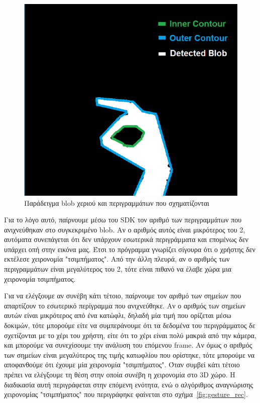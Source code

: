 \begin{figure}[H]
    \centering
    \includegraphics[scale=0.7, angle=0]{Files/Figures/2.pdf}
    \caption[Παράδειγμα blob χεριού και περιγραμμάτων που σχηματίζονται]{Παράδειγμα blob χεριού και περιγραμμάτων που σχηματίζονται}
    \label{fig:hand_blob}
\end{figure}



Για το λόγο αυτό, παίρνουμε μέσω του SDK τον αριθμό των περιγραμμάτων που ανιχνεύθηκαν στο συγκεκριμένο blob. Αν ο αριθμός αυτός είναι μικρότερος του 2, αυτόματα συνεπάγεται ότι δεν υπάρχουν εσωτερικά περιγράμματα και επομένως δεν υπάρχει οπή στην εικόνα μας. Έτσι το πρόγραμμα γνωρίζει σίγουρα ότι ο χρήστης δεν εκτέλεσε χειρονομία "τσιμπήματος". Από την άλλη πλευρά, αν ο αριθμός των περιγραμμάτων είναι μεγαλύτερος του 2, τότε είναι πιθανό να έλαβε χώρα μια χειρονομία τσιμπήματος. 


Για να ελέγξουμε αν συνέβη κάτι τέτοιο, παίρνουμε τον αριθμό των σημείων που απαρτίζουν το εσωτερικό περίγραμμα που ανιχνεύθηκε. Αν ο αριθμός των σημείων αυτών είναι μικρότερος από ένα κατώφλι, δηλαδή μία τιμή που ορίζεται μέσω δοκιμών, τότε μπορούμε είτε να συμπεράνουμε ότι τα δεδομένα του περιγράμματος δε σχετίζονται με το χέρι του χρήστη, είτε ότι το χέρι είναι πολύ μακριά από την κάμερα, και μπορούμε να συνεχίσουμε την ανάλυση του επόμενου frame. Αν όμως ο αριθμός των σημείων είναι μεγαλύτερος της τιμής κατωφλίου που ορίστηκε, τότε μπορούμε να αποφανθούμε ότι έχουμε μία χειρονομία "τσιμπήματος". Όταν συμβεί κάτι τέτοιο πρέπει να ελέγξουμε τη θέση στην οποία συνέβη η χειρονομία στο 3D χώρο. Η διαδικασία αυτή περιγράφεται στην επόμενη ενότητα, ενώ ο αλγόριθμος αναγνώρισης χειρονομίας "τσιμπήματος" που περιγράφηκε φαίνεται στο σχήμα~\ref{fig:gesture_rec}.







